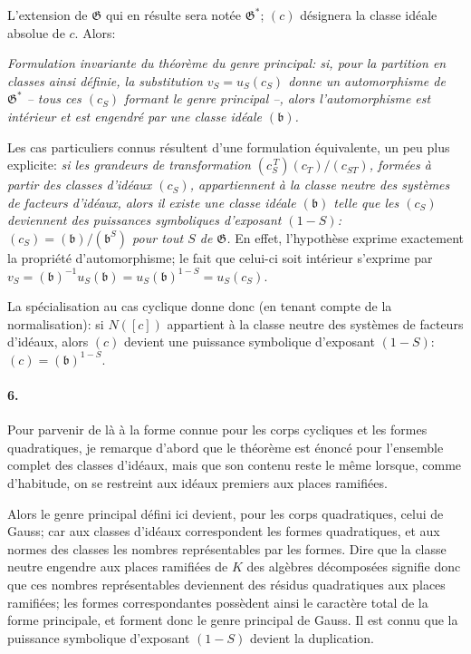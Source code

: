L'extension de \(\mathfrak{G}\) qui en résulte sera notée \(\mathfrak{G}^\ast\); \((c)\) désignera la classe idéale absolue de \(c\). Alors:

\emph{Formulation invariante du théorème du genre principal: si, pour la partition en classes ainsi définie, la substitution \(v_S=u_S(c_S)\) donne un automorphisme de \(\mathfrak{G}^\ast\) -- tous ces \((c_S)\) formant le genre principal --, alors l'automorphisme est intérieur et est engendré par une classe idéale \((\mathfrak b)\).}

Les cas particuliers connus résultent d'une formulation équivalente, un peu plus explicite: \emph{si les grandeurs de transformation \((c_S^{\,T})(c_T)/(c_{ST})\), formées à partir des classes d'idéaux \((c_S)\), appartiennent à la classe neutre des systèmes de facteurs d'idéaux, alors il existe une classe idéale \((\mathfrak b)\) telle que les \((c_S)\) deviennent des puissances symboliques d'exposant \((1-S)\): \((c_S)=(\mathfrak b)/(\mathfrak b^{S})\) pour tout \(S\) de \(\mathfrak{G}\).} En effet, l'hypothèse exprime exactement la propriété d'automorphisme; le fait que celui-ci soit intérieur s'exprime par \(v_S=(\mathfrak b)^{-1}u_S(\mathfrak b)=u_S(\mathfrak b)^{1-S}=u_S(c_S)\).

La spécialisation au cas cyclique donne donc (en tenant compte de la normalisation): si \(N([c])\) appartient à la classe neutre des systèmes de facteurs d'idéaux, alors \((c)\) devient une puissance symbolique d'exposant \((1-S)\): \((c)=(\mathfrak b)^{1-S}\).

\paragraph{6.}
Pour parvenir de là à la forme connue pour les corps cycliques et les formes quadratiques, je remarque d'abord que le théorème est énoncé pour l'ensemble complet des classes d'idéaux, mais que son contenu reste le même lorsque, comme d'habitude, on se restreint aux idéaux premiers aux places ramifiées.

Alors le genre principal défini ici devient, pour les corps quadratiques, celui de Gauss; car aux classes d'idéaux correspondent les formes quadratiques, et aux normes des classes les nombres représentables par les formes. Dire que la classe neutre engendre aux places ramifiées de \(K\) des algèbres décomposées signifie donc que ces nombres représentables deviennent des résidus quadratiques aux places ramifiées; les formes correspondantes possèdent ainsi le caractère total de la forme principale, et forment donc le genre principal de Gauss. Il est connu que la puissance symbolique d'exposant \((1-S)\) devient la duplication.

